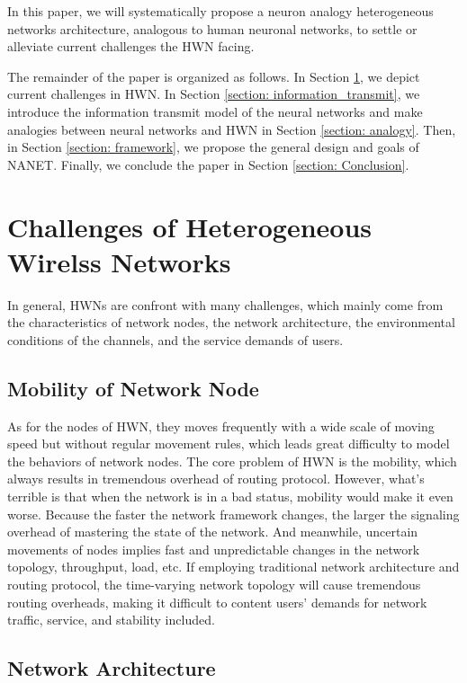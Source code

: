 \documentclass[journal,comsoc]{IEEEtran}
\begin{document}
	
		
		In this paper, we will systematically propose a neuron analogy heterogeneous networks architecture, analogous to human neuronal networks, to settle or alleviate current challenges the HWN facing.
		
		The remainder of the paper is organized as follows. 
		In Section \ref{section: research_challenges}, we depict current challenges in HWN.
		In Section \ref{section: information_transmit}, we introduce the information transmit model of the neural networks 
		and make analogies between neural networks and HWN in Section \ref{section: analogy}.
		Then, in Section \ref{section: framework}, we propose the general design and goals of NANET.
		Finally, we conclude the paper in Section \ref{section: Conclusion}.
	
	\section{Challenges of Heterogeneous Wirelss Networks}
	\label{section: research_challenges}
		In general, HWNs are confront with many challenges, 
		which mainly come from the characteristics of network nodes, the network architecture, 
		the environmental conditions of the channels, and the service demands of users.
		
		\subsection{Mobility of Network Node}
			As for the nodes of HWN,  they moves frequently with a wide scale of moving speed but without regular movement rules, 
			which leads great difficulty to model the behaviors of network nodes.
			The core problem of HWN is the mobility, which always results in tremendous overhead of routing protocol. 
			However, what's terrible is that when the network is in a bad status, mobility would make it even worse. 
			Because the faster the network framework changes, the larger the signaling overhead of mastering the state of the network.
			And meanwhile, uncertain movements of nodes implies fast and unpredictable changes in the network topology, throughput, load, etc. 
			If employing traditional network architecture and routing protocol, the time-varying network topology will cause tremendous routing overheads, 
			making it difficult to content users' demands for network traffic, service, and stability included.
			
		\subsection{Network Architecture}
		
\end{document}
